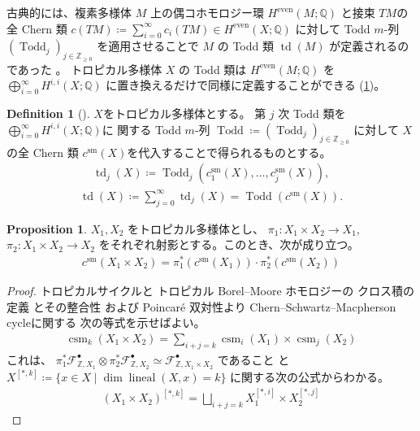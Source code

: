 \documentclass[a4paper,dvipdfmx,reqno,12pt]{amsart}
\theoremstyle{definition}
\newtheorem{definition}[theorem]{Definition}
\newtheorem{proposition}[theorem]{Proposition}
\newcommand{\deq}{\coloneqq}
\newcommand{\opn}[1]{\operatorname{#1}}
\numberwithin{equation}{section}
\begin{document}
古典的には、複素多様体 $M$ 上の偶コホモロジー環
$H^{\mathrm{even}}(M;\mathbb{Q})$
と接束 $TM$の全 Chern 類 
$c(TM)\deq \sum_{i=0}^{\infty}c_i(TM)\in 
H^{\mathrm{even}}(X;\mathbb{Q})$
に対して
Todd $m$-列 $(\opn{Todd}_j)_{j\in \mathbb{Z}_{\geq 0}}$
を適用させることで $M$ の Todd 類
$\opn{td}(M)$
が定義されるのであった
\cite[]{MR1335917}。
トロピカル多様体 $X$ の Todd 類は
$H^{\mathrm{even}}(M;\mathbb{Q})$ を
$\bigoplus_{i=0}^{\infty} H^{i,i}(X;\mathbb{Q})$
に置き換えるだけで同様に定義することができる
(\cref{definition-tropical-todd})。

\begin{definition}[{\cite{demedrano2023chern}}]
\label{definition-tropical-todd}
$X$をトロピカル多様体とする。
第 $j$ 次 Todd 類を
$\bigoplus_{i=0}^{\infty} H^{i,i}(X;\mathbb{Q})$に
関する Todd $m$-列 $\opn{Todd}\deq (\opn{Todd}_j)_{j\in \mathbb{Z}_{\geq 0}}$
に対して
$X$ の全 Chern 類
$c^{\mathrm{sm}}(X)$を代入することで得られるものとする。
\begin{align}
\opn{td}_j(X)\deq \opn{Todd}_j(c_{1}^{\mathrm{sm}}(X),
\ldots,c_{j}^{\mathrm{sm}}(X)),
\end{align}
\begin{align}
\opn{td}(X)\deq \sum_{j=0}^{\infty}\opn{td}_j(X)=
\opn{Todd}(c^{\mathrm{sm}}(X)).
\end{align}

\end{definition}

\begin{proposition}
$X_1,X_2$ をトロピカル多様体とし、
$\pi_1\colon X_1\times X_2 \to X_1$, 
$\pi_2\colon X_1\times X_2 \to X_2$
をそれぞれ射影とする。このとき、次が成り立つ。
\begin{align}
c^{\mathrm{sm}}(X_1\times X_2)=
\pi^{*}_1(c^{\mathrm{sm}}(X_1))\cdot 
\pi^{*}_2(c^{\mathrm{sm}}(X_2))
\end{align}

\end{proposition}

\begin{proof}
トロピカルサイクルと
トロピカル
Borel--Moore ホモロジーの
クロス積の定義
\cite[Definition 3.7, 
Definition 4.15]{gross2019sheaftheoretic}
とその整合性
\cite[Proposition 5.9]{gross2019sheaftheoretic}
および Poincar\'e 双対性より
Chern--Schwartz--Macpherson cycleに関する
次の等式を示せばよい。
\begin{align}
\opn{csm}_k(X_1\times X_2)=\sum_{i+j=k}
\opn{csm}_{i}(X_1)\times \opn{csm}_{j}(X_2)
\end{align}
これは、
$\pi_1^{*}\mathcal{F}^{\bullet}_{\mathbb{Z},X_1}\otimes
\pi_2^{*}\mathcal{F}^{\bullet}_{\mathbb{Z},X_2}
\simeq \mathcal{F}^{\bullet}_{\mathbb{Z},X_1\times X_2}$
であること\cite[Lemma 4.14]{gross2019sheaftheoretic}
と
$X^{[*,k]}\deq \{x\in X\mid \dim \opn{lineal}(X,x)=k\}$
に関する次の公式からわかる。
\begin{align}
(X_1\times X_2)^{[*,k]}=\bigsqcup_{i+j=k}
X_1^{[*,i]}\times X_2^{[*,j]}
\end{align}

\end{proof}
\end{document}
